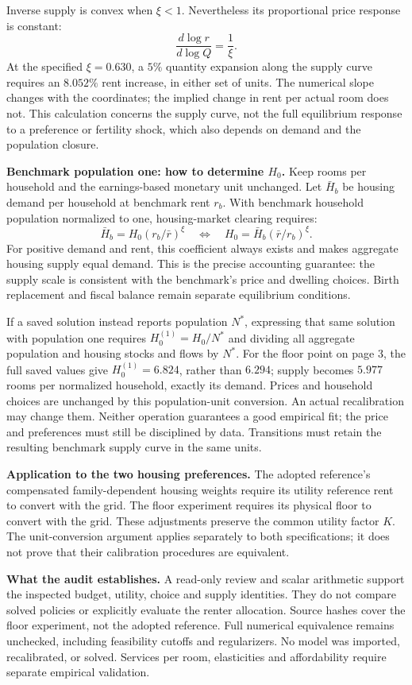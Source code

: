\documentclass[11pt,letterpaper]{article}
\begin{document}
Inverse supply is convex when $\xi<1$. Nevertheless its proportional price
response is constant:
\[
 \frac{d\log r}{d\log Q}=\frac1\xi.
\]
At the specified $\xi=0.630$, a $5\%$ quantity expansion along the supply curve
requires an $8.052\%$ rent increase, in either set of units. The numerical
slope changes with the coordinates; the implied change in rent per actual room
does not. This calculation concerns the supply curve, not the full equilibrium
response to a preference or fertility shock, which also depends on demand and
the population closure.

\textbf{Benchmark population one: how to determine $H_0$.} Keep rooms per
household and the earnings-based monetary unit unchanged. Let $\bar H_b$ be
housing demand per household at benchmark rent $r_b$. With benchmark household
population normalized to one, housing-market clearing requires:
\[
 \bar H_b=H_0(r_b/\bar r)^\xi
 \quad\Longleftrightarrow\quad
 \boxed{H_0=\bar H_b(\bar r/r_b)^\xi.}
\]
For positive demand and rent, this coefficient always exists and makes aggregate
housing supply equal demand. This is the precise accounting guarantee: the
supply scale is consistent with the benchmark's price and dwelling choices.
Birth replacement and fiscal balance remain separate equilibrium conditions.

If a saved solution instead reports population $N^*$, expressing that same
solution with population one requires $H_0^{(1)}=H_0/N^*$ and dividing all
aggregate population and housing stocks and flows by $N^*$. For the floor point
on page 3, the full saved values give $H_0^{(1)}=6.824$, rather than $6.294$;
supply becomes $5.977$ rooms per normalized household, exactly its demand.
Prices and household choices are unchanged by this population-unit conversion.
An actual recalibration may change them. Neither operation guarantees a good
empirical fit; the price and preferences must still be disciplined by data.
Transitions must retain the resulting benchmark supply curve in the same units.

\textbf{Application to the two housing preferences.} The adopted reference's
compensated family-dependent housing weights require its utility reference rent
to convert with the grid. The floor experiment requires its physical floor to
convert with the grid. These adjustments preserve the common utility factor
$K$. The unit-conversion argument applies separately to both specifications;
it does not prove that their calibration procedures are equivalent.

\textbf{What the audit establishes.} A read-only review and scalar arithmetic
support the inspected budget, utility, choice and supply identities. They do
not compare solved policies or explicitly evaluate the renter allocation.
Source hashes cover the floor experiment, not the adopted reference. Full
numerical equivalence remains unchecked, including feasibility cutoffs and
regularizers. No model was imported, recalibrated, or solved. Services per room,
elasticities and affordability require separate empirical validation.
\endgroup
\end{document}
